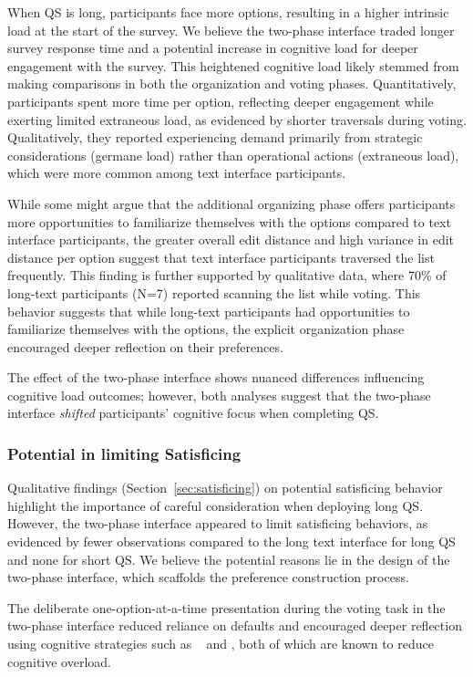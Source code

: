 When QS is long, participants face more options, resulting in a higher intrinsic load at the start of the survey. We believe the two-phase interface traded longer survey response time and a potential increase in cognitive load for deeper engagement with the survey. This heightened cognitive load likely stemmed from making comparisons in both the organization and voting phases. Quantitatively, participants spent more time per option, reflecting deeper engagement while exerting limited extraneous load, as evidenced by shorter traversals during voting. Qualitatively, they reported experiencing demand primarily from strategic considerations (germane load) rather than operational actions (extraneous load), which were more common among text interface participants.

While some might argue that the additional organizing phase offers participants more opportunities to familiarize themselves with the options compared to text interface participants, the greater overall edit distance and high variance in edit distance per option suggest that text interface participants traversed the list frequently. This finding is further supported by qualitative data, where 70\% of long-text participants (N=7) reported scanning the list while voting. This behavior suggests that while long-text participants had opportunities to familiarize themselves with the options, the explicit organization phase encouraged deeper reflection on their preferences.

The effect of the two-phase interface shows nuanced differences influencing cognitive load outcomes; however, both analyses suggest that the two-phase interface \textit{shifted} participants' cognitive focus when completing QS.

\subsubsection{Potential in limiting Satisficing}
Qualitative findings (Section~\ref{sec:satisficing}) on potential satisficing behavior highlight the importance of careful consideration when deploying long QS. However, the two-phase interface appeared to limit satisficing behaviors, as evidenced by fewer observations compared to the long text interface for long QS and none for short QS. We believe the potential reasons lie in the design of the two-phase interface, which scaffolds the preference construction process.

The deliberate one-option-at-a-time presentation during the voting task in the two-phase interface reduced reliance on defaults and encouraged deeper reflection using cognitive strategies such as \textit{}~\cite{simonSciencesArtificial1996} and \textit{}, both of which are known to reduce cognitive overload.

